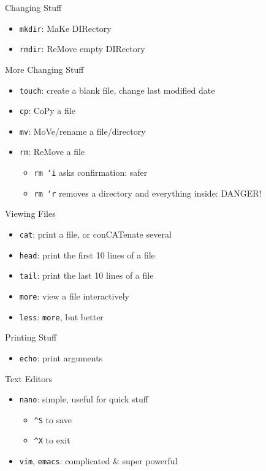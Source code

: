 \documentclass[pdf,usenames,dvipsnames,14pt]{beamer}%
\newcommand\hyphen{\char`\-}
\newcommand\textasciicaret{\textasciicircum}
\begin{document}
\begin{frame}{Changing Stuff}
	\begin{itemize}
		\item \texttt{mkdir}: MaKe DIRectory
		\item \texttt{rmdir}: ReMove empty DIRectory
	\end{itemize}
\end{frame}

\begin{frame}{More Changing Stuff}
	\begin{itemize}
		\item \texttt{touch}: create a blank file, change last modified date
		\item \texttt{cp}: CoPy a file
		\item \texttt{mv}: MoVe/rename a file/directory
		\item \texttt{rm}: ReMove a file
		\begin{itemize}
			\item \texttt{rm \hyphen i} asks confirmation: safer
			\item \texttt{rm \hyphen r} removes a directory and everything inside: DANGER!
		\end{itemize}
	\end{itemize}
\end{frame}

\begin{frame}{Viewing Files}
	\begin{itemize}
		\item \texttt{cat}: print a file, or conCATenate several
		\item \texttt{head}: print the first 10 lines of a file
		\item \texttt{tail}: print the last 10 lines of a file
		\item \texttt{more}: view a file interactively
		\item \texttt{less}: \texttt{more}, but better
	\end{itemize}
\end{frame}

\begin{frame}{Printing Stuff}
	\begin{itemize}
		\item \texttt{echo}: print arguments
	\end{itemize}
\end{frame}

\begin{frame}{Text Editors}
	\begin{itemize}
		\item \texttt{nano}: simple, useful for quick stuff
		\begin{itemize}
			\item \texttt{\textasciicaret S} to save
			\item \texttt{\textasciicaret X} to exit
		\end{itemize}
		\item \texttt{vim}, \texttt{emacs}: complicated \& super powerful
	\end{itemize}
\end{frame}
\end{document}
